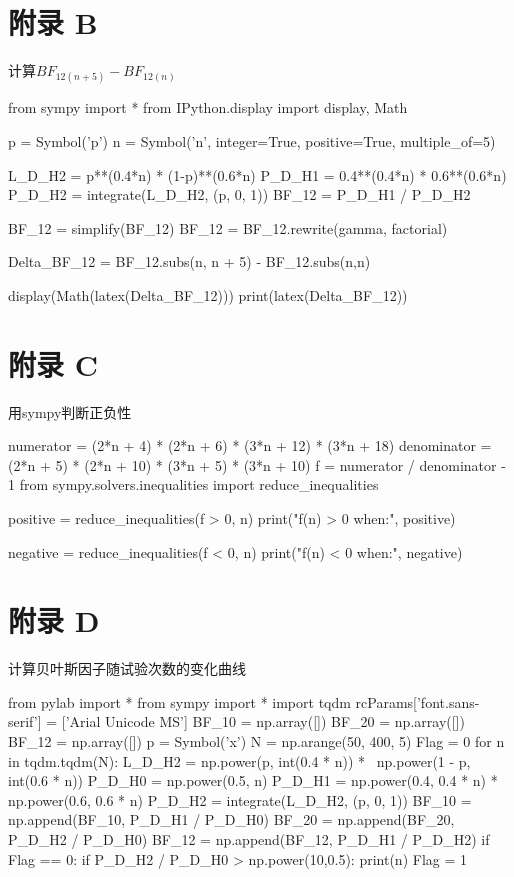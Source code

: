 \documentclass[stu,12pt,floatsintext]{apa7} %
\begin{document}
\section{附录 B}
\label{code2}
\noindent 计算\(BF_{12(n+5)}-BF_{12(n)}\)
\begin{python}
    from sympy import *
    from IPython.display import display, Math

    p = Symbol('p')
    n = Symbol('n', integer=True, positive=True, multiple_of=5)

    L_D_H2 = p**(0.4*n) * (1-p)**(0.6*n)
    P_D_H1 = 0.4**(0.4*n) * 0.6**(0.6*n)
    P_D_H2 = integrate(L_D_H2, (p, 0, 1))
    BF_12 = P_D_H1 / P_D_H2

    BF_12 = simplify(BF_12)
    BF_12 = BF_12.rewrite(gamma, factorial)

    Delta_BF_12 = BF_12.subs(n, n + 5) - BF_12.subs(n,n)

    display(Math(latex(Delta_BF_12)))
    print(latex(Delta_BF_12))
\end{python}

\section{附录 C}
\label{code3}
\noindent 用sympy判断正负性
\begin{python}
    numerator = (2*n + 4) * (2*n + 6) * (3*n + 12)  * (3*n + 18)
    denominator = (2*n + 5) * (2*n + 10) * (3*n + 5) * (3*n + 10) 
    f = numerator / denominator - 1
    from sympy.solvers.inequalities import reduce_inequalities

    positive = reduce_inequalities(f > 0, n)
    print("f(n) > 0 when:", positive)

    negative = reduce_inequalities(f < 0, n)
    print("f(n) < 0 when:", negative)
\end{python}

\section{附录 D}
\label{code4}
\noindent 计算贝叶斯因子随试验次数的变化曲线
\begin{python}
    from pylab import *
    from sympy import *
    import tqdm
    rcParams['font.sans-serif'] = ['Arial Unicode MS']
    BF_10 = np.array([])
    BF_20 = np.array([])
    BF_12 = np.array([])
    p = Symbol('x')
    N = np.arange(50, 400, 5)
    Flag = 0
    for n in tqdm.tqdm(N):
        L_D_H2 = np.power(p, int(0.4 * n)) * \
            np.power(1 - p, int(0.6 * n))
        P_D_H0 = np.power(0.5, n)
        P_D_H1 = np.power(0.4, 0.4 * n) * np.power(0.6, 0.6 * n)
        P_D_H2 = integrate(L_D_H2, (p, 0, 1))
        BF_10 = np.append(BF_10, P_D_H1 / P_D_H0)
        BF_20 = np.append(BF_20, P_D_H2 / P_D_H0)
        BF_12 = np.append(BF_12, P_D_H1 / P_D_H2)
        if Flag == 0:
            if P_D_H2 / P_D_H0 > np.power(10,0.5):
                print(n)
                Flag = 1
\end{python}
\end{document}

